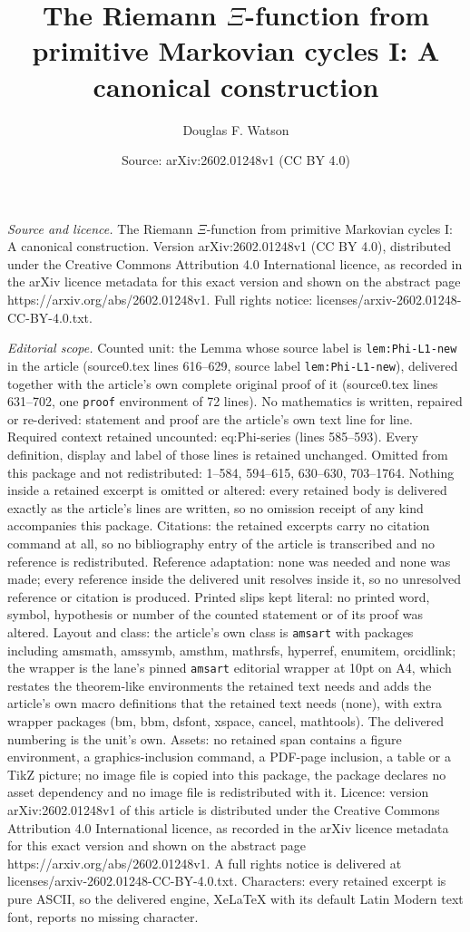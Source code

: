 \documentclass[10pt,a4paper]{amsart}
\title[The Riemann $\Xi$-function from primitive Markovian cycles I]{The Riemann $\Xi$-function from primitive Markovian cycles I: A canonical construction}
\author{Douglas F. Watson}
\date{Source: arXiv:2602.01248v1 (CC BY 4.0)}
\begin{document}
\maketitle

\noindent\emph{Source and licence.} The Riemann $\Xi$-function from primitive Markovian cycles I: A canonical construction. Version arXiv:2602.01248v1 (CC BY 4.0), distributed under the Creative Commons Attribution 4.0 International licence, as recorded in the arXiv licence metadata for this exact version and shown on the abstract page https://arxiv.org/abs/2602.01248v1. Full rights notice: licenses/arxiv-2602.01248-CC-BY-4.0.txt.\par\smallskip

\noindent\textit{Editorial scope.} Counted unit: the Lemma whose source label is \texttt{lem:Phi-L1-new} in the article (source0.tex lines 616--629, source label \texttt{lem:Phi-L1-new}), delivered together with the article's own complete original proof of it (source0.tex lines 631--702, one \texttt{proof} environment of 72 lines). No mathematics is written, repaired or re-derived: statement and proof are the article's own text line for line. Required context retained uncounted: eq:Phi-series (lines 585--593). Every definition, display and label of those lines is retained unchanged. Omitted from this package and not redistributed: 1--584, 594--615, 630--630, 703--1764. Nothing inside a retained excerpt is omitted or altered: every retained body is delivered exactly as the article's lines are written, so no omission receipt of any kind accompanies this package. Citations: the retained excerpts carry no citation command at all, so no bibliography entry of the article is transcribed and no reference is redistributed. Reference adaptation: none was needed and none was made; every reference inside the delivered unit resolves inside it, so no unresolved reference or citation is produced. Printed slips kept literal: no printed word, symbol, hypothesis or number of the counted statement or of its proof was altered. Layout and class: the article's own class is \texttt{amsart} with packages including amsmath, amssymb, amsthm, mathrsfs, hyperref, enumitem, orcidlink; the wrapper is the lane's pinned \texttt{amsart} editorial wrapper at 10pt on A4, which restates the theorem-like environments the retained text needs and adds the article's own macro definitions that the retained text needs (none), with extra wrapper packages (bm, bbm, dsfont, xspace, cancel, mathtools). The delivered numbering is the unit's own. Assets: no retained span contains a figure environment, a graphics-inclusion command, a PDF-page inclusion, a table or a TikZ picture; no image file is copied into this package, the package declares no asset dependency and no image file is redistributed with it. Licence: version arXiv:2602.01248v1 of this article is distributed under the Creative Commons Attribution 4.0 International licence, as recorded in the arXiv licence metadata for this exact version and shown on the abstract page https://arxiv.org/abs/2602.01248v1. A full rights notice is delivered at licenses/arxiv-2602.01248-CC-BY-4.0.txt. Characters: every retained excerpt is pure ASCII, so the delivered engine, XeLaTeX with its default Latin Modern text font, reports no missing character.
\end{document}
